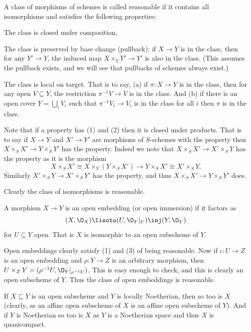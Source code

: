     A class of morphisms of schemes is called {\emphcolor reasonable} if it contains all isomorphisms
    and satisfies the following properties:
    \benum
        \item The class is closed under composition,
        \item The class is preserved by base change (pullback): if $X\to Y$ is in the class, then for any
        $Y'\to Y$, the induced map $X\times_YY'\to Y'$ is also in the class.
        (This assumes the pullback exists, and we will see that pullbacks of schemes always exist.)
        \item The class is {\emphcolor local on target}.
        That is to say, (a) if $\pi\colon X\to Y$ is in the class, then for any open $V\subseteq Y$, the
        restriction $\pi^{-1}V\to V$ is in the class.
        And (b) if there is an open cover $Y=\bigcup_iV_i$ such that $\pi^{-1}V_i\to V_i$ is in the class for
        all $i$ then $\pi$ is in the class.
    \eenum

\edefn

Note that if a property has (1) and (2) then it is closed under products.
That is to say if $X\to Y$ and $X'\to Y'$ are morphisms of $S$-schemes with the property then
$X\times_SX'\to Y\times_SY'$ has the property.
Indeed we note that $X\times_SX'\to X'\times_SY$ has the property as it is the morphism
$$ X\times_SX' \cong X\times_Y(Y\times_SX') \to Y\times_SX' \cong X'\times_SY . $$
Similarly $X'\times_SY\to X'\times_SY'$ has the property, and thus $X\times_SX'\to Y\times_SY'$ does.

\bexam

    Clearly the class of isomorphisms is reasonable.

\eexam

\bdefn

    A morphism $X\to Y$ is an {\emphcolor open embedding} (or {\emphcolor open immersion}) if it factors
    as
    $$ (X,\O_X) \lisoto (U,\O_Y|_U) \inj (Y,\O_Y) $$
    for $U\subseteq Y$ open.
    That is $X$ is isomorphic to an open subscheme of $Y$.

\edefn

Open embeddings clearly satisfy (1) and (3) of being reasonable.
Now if $\iota\colon U\to Z$ is an open embedding and $\rho\colon Y\to Z$ is an arbitrary morphism, then
$U\times_ZY=(\rho^{-1}U,\O_Y|_{\rho^{-1}U})$.
This is easy enough to check, and this is clearly an open subscheme of $Y$.
Thus the class of open embeddings is reasonable.

If $X\subseteq Y$ is an open subscheme and $Y$ is locally Noetherian, then so too is $X$ (clearly, as an
affine open subscheme of $X$ is an affine open subscheme of $Y$).
And if $Y$ is Noetherian so too is $X$ as $Y$ is a Noetherian space and thus $X$ is quasicompact.


